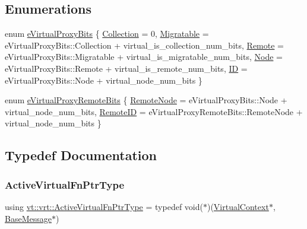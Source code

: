 \subsection*{Enumerations}
\begin{DoxyCompactItemize}
\item 
enum \hyperlink{namespacevt_1_1vrt_a408950d7781cc0422dcc4bdf723fc281}{e\+Virtual\+Proxy\+Bits} \{ \newline
\hyperlink{namespacevt_1_1vrt_a408950d7781cc0422dcc4bdf723fc281a2f97fc194c438c28df53050b30e4228a}{Collection} = 0, 
\hyperlink{namespacevt_1_1vrt_a408950d7781cc0422dcc4bdf723fc281a243d421d4c34b16822e31ff39bc6c72d}{Migratable} = e\+Virtual\+Proxy\+Bits\+:\+:Collection + virtual\+\_\+is\+\_\+collection\+\_\+num\+\_\+bits, 
\hyperlink{namespacevt_1_1vrt_a408950d7781cc0422dcc4bdf723fc281ac81bc94ba7d9e2ef6791ddbd24daa667}{Remote} = e\+Virtual\+Proxy\+Bits\+:\+:Migratable + virtual\+\_\+is\+\_\+migratable\+\_\+num\+\_\+bits, 
\hyperlink{namespacevt_1_1vrt_a408950d7781cc0422dcc4bdf723fc281af813296532ba4d62a38c38700638a143}{Node} = e\+Virtual\+Proxy\+Bits\+:\+:Remote + virtual\+\_\+is\+\_\+remote\+\_\+num\+\_\+bits, 
\newline
\hyperlink{namespacevt_1_1vrt_a408950d7781cc0422dcc4bdf723fc281a5f8bd174c898ce0f41d7cd6f2747201f}{ID} = e\+Virtual\+Proxy\+Bits\+:\+:Node + virtual\+\_\+node\+\_\+num\+\_\+bits
 \}
\item 
enum \hyperlink{namespacevt_1_1vrt_a5a8105b744eec1e3d031c4cd92dece7e}{e\+Virtual\+Proxy\+Remote\+Bits} \{ \hyperlink{namespacevt_1_1vrt_a5a8105b744eec1e3d031c4cd92dece7ea8fb0adb36660bd05ba5033e93cc8c3f0}{Remote\+Node} = e\+Virtual\+Proxy\+Bits\+:\+:Node + virtual\+\_\+node\+\_\+num\+\_\+bits, 
\hyperlink{namespacevt_1_1vrt_a5a8105b744eec1e3d031c4cd92dece7eafa45aa15be6f922c8e1e4c78dbdad535}{Remote\+ID} = e\+Virtual\+Proxy\+Remote\+Bits\+:\+:Remote\+Node + virtual\+\_\+node\+\_\+num\+\_\+bits
 \}
\end{DoxyCompactItemize}


\subsection{Typedef Documentation}
\mbox{\label{namespacevt_1_1vrt_a8302f182ba4663eee7afc536160d7ef9}} 
\subsubsection{\texorpdfstring{Active\+Virtual\+Fn\+Ptr\+Type}{ActiveVirtualFnPtrType}}
{\footnotesize\ttfamily using \hyperlink{namespacevt_1_1vrt_a8302f182ba4663eee7afc536160d7ef9}{vt\+::vrt\+::\+Active\+Virtual\+Fn\+Ptr\+Type} = typedef void($\ast$)(\hyperlink{structvt_1_1vrt_1_1_virtual_context}{Virtual\+Context}$\ast$, \hyperlink{namespacevt_ac34f95a5e2b8109b55bfba52b074443d}{Base\+Message}$\ast$)}

